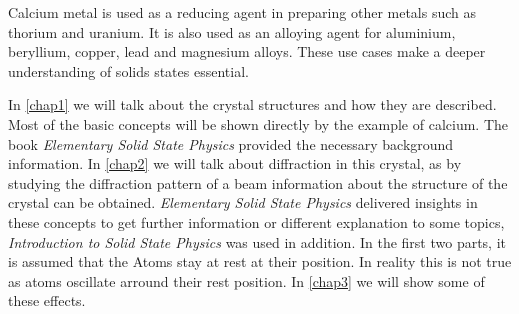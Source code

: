 Calcium metal is used as a reducing agent in preparing other metals such as 
thorium and uranium. 
It is also used as an alloying agent for aluminium, beryllium, copper, lead 
and magnesium alloys.
These use cases make a deeper understanding of solids states essential.

In \ref{chap1}  we will talk about the crystal structures and how they 
are described.
Most of the basic concepts will be shown directly by the example of calcium. 
The book \textit{Elementary Solid State Physics}
provided the necessary background information. In \ref{chap2}  we will 
talk about diffraction in this crystal,
as by studying the diffraction pattern of a beam information about the 
structure of the crystal can be obtained.
\textit{Elementary Solid State Physics} \cite{elementary_SSP} delivered insights in these concepts to get 
further information or different 
explanation to some topics, \textit{Introduction to Solid State Physics} \cite{kittel} was used in addition. 
In the first two parts, it is assumed that the Atoms stay at rest at their
position. In reality this is not true as atoms oscillate arround their
rest position. In \ref{chap3}  we will show some of these effects.

